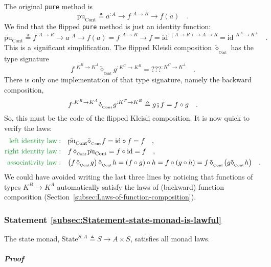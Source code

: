 The original \lstinline!pure! method is 
\[
\text{pu}_{\text{Cont}}\triangleq a^{:A}\rightarrow f^{:A\rightarrow R}\rightarrow f(a)\quad.
\]
We find that the flipped \lstinline!pure! method is just an identity
function:
\[
\tilde{\text{pu}}_{\text{Cont}}\triangleq f^{:A\rightarrow R}\rightarrow a^{:A}\rightarrow f(a)=f^{:A\rightarrow R}\rightarrow f=\text{id}^{:\left(A\rightarrow R\right)\rightarrow A\rightarrow R}=\text{id}^{:K^{A}\rightarrow K^{A}}\quad.
\]
This is a significant simplification. The flipped Kleisli composition
$\tilde{\diamond}_{_{\text{Cont}}}$ has the type signature
\[
f^{:K^{B}\rightarrow K^{A}}\tilde{\diamond}_{_{\text{Cont}}}g^{:K^{C}\rightarrow K^{B}}=\text{???}^{:K^{C}\rightarrow K^{A}}\quad.
\]
There is only one implementation of that type signature, namely the
backward composition,
\[
f^{:K^{B}\rightarrow K^{A}}\tilde{\diamond}_{_{\text{Cont}}}g^{:K^{C}\rightarrow K^{B}}\triangleq g\bef f=f\circ g\quad.
\]
So, this must be the code of the flipped Kleisli composition. It is
now quick to verify the laws:
\begin{align*}
{\color{greenunder}\text{left identity law}:}\quad & \tilde{\text{pu}}_{\text{Cont}}\tilde{\diamond}_{_{\text{Cont}}}f=\text{id}\circ f=f\quad,\\
{\color{greenunder}\text{right identity law}:}\quad & f\,\tilde{\diamond}_{_{\text{Cont}}}\tilde{\text{pu}}_{\text{Cont}}=f\circ\text{id}=f\quad,\\
{\color{greenunder}\text{associativity law}:}\quad & \big(f\,\tilde{\diamond}_{_{\text{Cont}}}g\big)\,\tilde{\diamond}_{_{\text{Cont}}}h=(f\circ g)\circ h=f\circ(g\circ h)=f\,\tilde{\diamond}_{_{\text{Cont}}}\big(g\tilde{\diamond}_{_{\text{Cont}}}h\big)\quad.
\end{align*}
We could have avoided writing the last three lines by noticing that
functions of types $K^{B}\rightarrow K^{A}$ automatically satisfy
the laws of (backward) function composition (Section~\ref{subsec:Laws-of-function-composition}).

\subsubsection{Statement \label{subsec:Statement-state-monad-is-lawful}\ref{subsec:Statement-state-monad-is-lawful}}

The state monad, $\text{State}^{S,A}\triangleq S\rightarrow A\times S$,
satisfies all monad laws.

\subparagraph{Proof}

